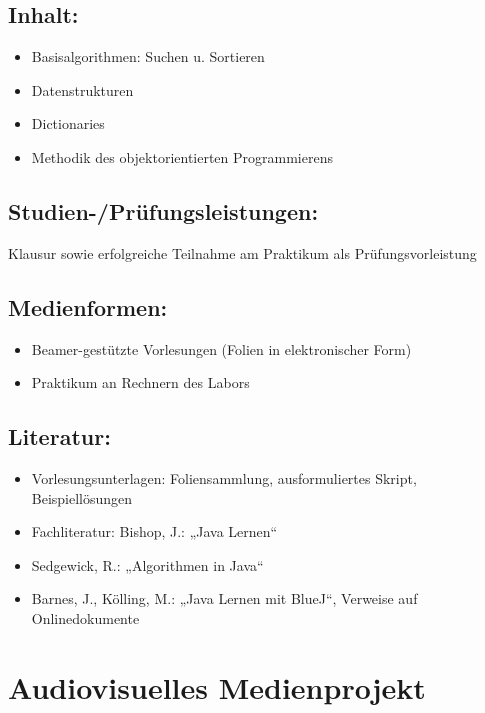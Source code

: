 \section*{Inhalt:}\label{inhalt-1}

\begin{itemize}
\tightlist
\item
  Basisalgorithmen: Suchen u. Sortieren
\item
  Datenstrukturen
\item
  Dictionaries
\item
  Methodik des objektorientierten Programmierens
\end{itemize}

\section*{Studien-/Prüfungsleistungen:}\label{studien-pruxfcfungsleistungen-1}

Klausur sowie erfolgreiche Teilnahme am Praktikum als
Prüfungsvorleistung

\section*{Medienformen:}\label{medienformen-1}

\begin{itemize}
\tightlist
\item
  Beamer-gestützte Vorlesungen (Folien in elektronischer Form)
\item
  Praktikum an Rechnern des Labors
\end{itemize}

\section*{Literatur:}\label{literatur-1}

\begin{itemize}
\tightlist
\item
  Vorlesungsunterlagen: Foliensammlung, ausformuliertes Skript,
  Beispiellösungen
\item
  Fachliteratur: Bishop, J.: „Java Lernen``
\item
  Sedgewick, R.: „Algorithmen in Java``
\item
  Barnes, J., Kölling, M.: „Java Lernen mit BlueJ``, Verweise auf
  Onlinedokumente
\end{itemize}

\chapter{Audiovisuelles
Medienprojekt}\label{audiovisuelles-medienprojekt}

